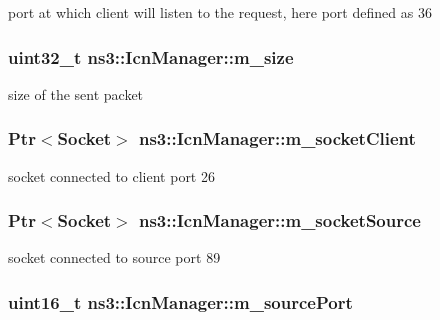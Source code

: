 port at which client will listen to the request, here port defined as 36 

\hypertarget{classns3_1_1IcnManager_a5b544ba6282f0ac718ae203380ed5f3a}{
\subsubsection[{m\-\_\-size}]{\setlength{\rightskip}{0pt plus 5cm}uint32\-\_\-t ns3\-::\-Icn\-Manager\-::m\-\_\-size\hspace{0.3cm}{\ttfamily [private]}}}\label{classns3_1_1IcnManager_a5b544ba6282f0ac718ae203380ed5f3a}


size of the sent packet 

\hypertarget{classns3_1_1IcnManager_a24764426c0a4f06ccfc560cf333641b9}{
\subsubsection[{m\-\_\-socket\-Client}]{\setlength{\rightskip}{0pt plus 5cm}Ptr$<$Socket$>$ ns3\-::\-Icn\-Manager\-::m\-\_\-socket\-Client\hspace{0.3cm}{\ttfamily [private]}}}\label{classns3_1_1IcnManager_a24764426c0a4f06ccfc560cf333641b9}


socket connected to client port 26 

\hypertarget{classns3_1_1IcnManager_a6ed2472d0ef144df7ae0349c7faefc12}{
\subsubsection[{m\-\_\-socket\-Source}]{\setlength{\rightskip}{0pt plus 5cm}Ptr$<$Socket$>$ ns3\-::\-Icn\-Manager\-::m\-\_\-socket\-Source\hspace{0.3cm}{\ttfamily [private]}}}\label{classns3_1_1IcnManager_a6ed2472d0ef144df7ae0349c7faefc12}


socket connected to source port 89 

\hypertarget{classns3_1_1IcnManager_a93399455541c4a44cf75cbbbc0b5c56d}{
\subsubsection[{m\-\_\-source\-Port}]{\setlength{\rightskip}{0pt plus 5cm}uint16\-\_\-t ns3\-::\-Icn\-Manager\-::m\-\_\-source\-Port\hspace{0.3cm}{\ttfamily [private]}}}\label{classns3_1_1IcnManager_a93399455541c4a44cf75cbbbc0b5c56d}


